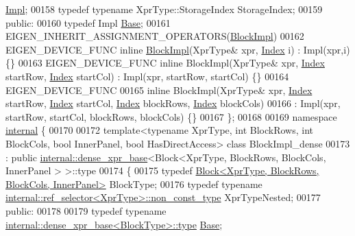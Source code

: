 \begin{DoxyCode}
       \hyperlink{class_eigen_1_1_block_impl}{Impl};
00158     \textcolor{keyword}{typedef} \textcolor{keyword}{typename} XprType::StorageIndex StorageIndex;
00159   \textcolor{keyword}{public}:
00160     \textcolor{keyword}{typedef} Impl \hyperlink{class_eigen_1_1_block_impl}{Base};
00161     EIGEN\_INHERIT\_ASSIGNMENT\_OPERATORS(\hyperlink{class_eigen_1_1_block_impl}{BlockImpl})
00162     EIGEN\_DEVICE\_FUNC \textcolor{keyword}{inline} \hyperlink{class_eigen_1_1_block_impl}{BlockImpl}(XprType& xpr, \hyperlink{namespace_eigen_a62e77e0933482dafde8fe197d9a2cfde}{Index} i) : Impl(xpr,i) \{\}
00163     EIGEN\_DEVICE\_FUNC \textcolor{keyword}{inline} BlockImpl(XprType& xpr, \hyperlink{namespace_eigen_a62e77e0933482dafde8fe197d9a2cfde}{Index} startRow, \hyperlink{namespace_eigen_a62e77e0933482dafde8fe197d9a2cfde}{Index} startCol) : Impl(xpr, 
      startRow, startCol) \{\}
00164     EIGEN\_DEVICE\_FUNC
00165     \textcolor{keyword}{inline} BlockImpl(XprType& xpr, \hyperlink{namespace_eigen_a62e77e0933482dafde8fe197d9a2cfde}{Index} startRow, \hyperlink{namespace_eigen_a62e77e0933482dafde8fe197d9a2cfde}{Index} startCol, 
      \hyperlink{namespace_eigen_a62e77e0933482dafde8fe197d9a2cfde}{Index} blockRows, \hyperlink{namespace_eigen_a62e77e0933482dafde8fe197d9a2cfde}{Index} blockCols)
00166       : Impl(xpr, startRow, startCol, blockRows, blockCols) \{\}
00167 \};
00168 
00169 \textcolor{keyword}{namespace }\hyperlink{namespaceinternal}{internal} \{
00170 
00172 \textcolor{keyword}{template}<\textcolor{keyword}{typename} XprType, \textcolor{keywordtype}{int} BlockRows, \textcolor{keywordtype}{int} BlockCols, \textcolor{keywordtype}{bool} InnerPanel, \textcolor{keywordtype}{bool} HasDirectAccess> \textcolor{keyword}{class }
      BlockImpl\_dense
00173   : \textcolor{keyword}{public} \hyperlink{struct_eigen_1_1internal_1_1dense__xpr__base}{internal::dense\_xpr\_base}<Block<XprType, BlockRows, BlockCols, InnerPanel
      > >::type
00174 \{
00175     \textcolor{keyword}{typedef} \hyperlink{group___core___module_class_eigen_1_1_block}{Block<XprType, BlockRows, BlockCols, InnerPanel>}
       BlockType;
00176     \textcolor{keyword}{typedef} \textcolor{keyword}{typename} \hyperlink{class_eigen_1_1internal_1_1_tensor_lazy_evaluator_writable}{internal::ref\_selector<XprType>::non\_const\_type}
       XprTypeNested;
00177   \textcolor{keyword}{public}:
00178 
00179     \textcolor{keyword}{typedef} \textcolor{keyword}{typename} \hyperlink{struct_eigen_1_1internal_1_1dense__xpr__base}{internal::dense\_xpr\_base<BlockType>::type} 
      \hyperlink{class_eigen_1_1_block_impl}{Base};

\end{DoxyCode}
